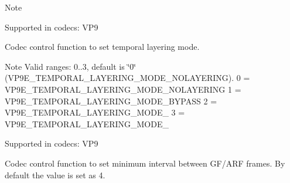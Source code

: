\begin{Desc}
\begin{description}
\begin{DoxyNote}{Note}
\end{DoxyNote}
Supported in codecs\+: V\+P9 \item[{\em 
V\+P9\+E\+\_\+\+S\+E\+T\+\_\+\+T\+E\+M\+P\+O\+R\+A\+L\+\_\+\+L\+A\+Y\+E\+R\+I\+N\+G\+\_\+\+M\+O\+DE\hypertarget{group__vp8__encoder_gga6deae3d561c838952552c3d3756322eca34af61e36500e1455aa2fc5bf62183ea}{}\label{group__vp8__encoder_gga6deae3d561c838952552c3d3756322eca34af61e36500e1455aa2fc5bf62183ea}
}]Codec control function to set temporal layering mode. \begin{DoxyNote}{Note}
Valid ranges\+: 0..3, default is \char`\"{}0\char`\"{} (V\+P9\+E\+\_\+\+T\+E\+M\+P\+O\+R\+A\+L\+\_\+\+L\+A\+Y\+E\+R\+I\+N\+G\+\_\+\+M\+O\+D\+E\+\_\+\+N\+O\+L\+A\+Y\+E\+R\+I\+NG). 0 = V\+P9\+E\+\_\+\+T\+E\+M\+P\+O\+R\+A\+L\+\_\+\+L\+A\+Y\+E\+R\+I\+N\+G\+\_\+\+M\+O\+D\+E\+\_\+\+N\+O\+L\+A\+Y\+E\+R\+I\+NG 1 = V\+P9\+E\+\_\+\+T\+E\+M\+P\+O\+R\+A\+L\+\_\+\+L\+A\+Y\+E\+R\+I\+N\+G\+\_\+\+M\+O\+D\+E\+\_\+\+B\+Y\+P\+A\+SS 2 = V\+P9\+E\+\_\+\+T\+E\+M\+P\+O\+R\+A\+L\+\_\+\+L\+A\+Y\+E\+R\+I\+N\+G\+\_\+\+M\+O\+D\+E\+\_ 3 = V\+P9\+E\+\_\+\+T\+E\+M\+P\+O\+R\+A\+L\+\_\+\+L\+A\+Y\+E\+R\+I\+N\+G\+\_\+\+M\+O\+D\+E\+\_
\end{DoxyNote}
Supported in codecs\+: V\+P9 \item[{\em 
V\+P9\+E\+\_\+\+S\+E\+T\+\_\+\+M\+I\+N\+\_\+\+G\+F\+\_\+\+I\+N\+T\+E\+R\+V\+AL\hypertarget{group__vp8__encoder_gga6deae3d561c838952552c3d3756322eca04ae4a1b699c5d22f2510c7509124ea9}{}\label{group__vp8__encoder_gga6deae3d561c838952552c3d3756322eca04ae4a1b699c5d22f2510c7509124ea9}
}]Codec control function to set minimum interval between G\+F/\+A\+RF frames. By default the value is set as 4.


\end{description}
\end{Desc}
